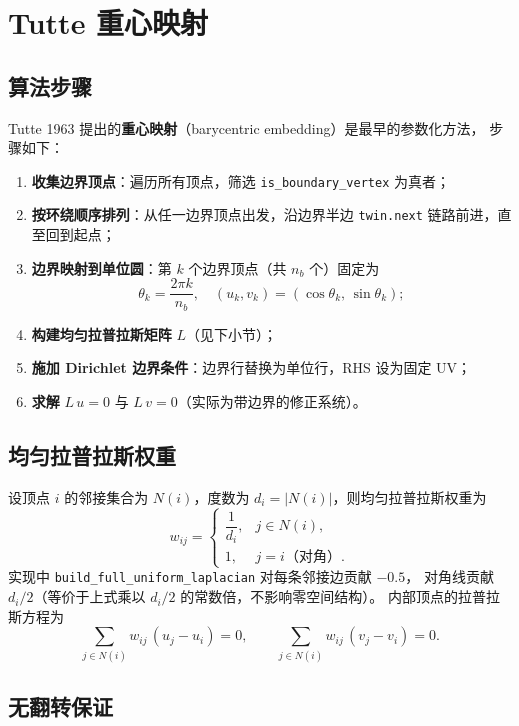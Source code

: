 \documentclass[11pt,a4paper]{article}
\begin{document}
\section{Tutte 重心映射}

\subsection{算法步骤}

Tutte 1963 提出的\textbf{重心映射}（barycentric embedding）是最早的参数化方法，
步骤如下：

\begin{enumerate}
  \item \textbf{收集边界顶点}：遍历所有顶点，筛选 \texttt{is\_boundary\_vertex} 为真者；
  \item \textbf{按环绕顺序排列}：从任一边界顶点出发，沿边界半边
        \texttt{twin.next} 链路前进，直至回到起点；
  \item \textbf{边界映射到单位圆}：第 $k$ 个边界顶点（共 $n_b$ 个）固定为
        \[
          \theta_k = \frac{2\pi k}{n_b}, \quad
          (u_k, v_k) = (\cos\theta_k,\, \sin\theta_k);
        \]
  \item \textbf{构建均匀拉普拉斯矩阵} $L$（见下小节）；
  \item \textbf{施加 Dirichlet 边界条件}：边界行替换为单位行，RHS 设为固定 UV；
  \item \textbf{求解} $L\,u = 0$ 与 $L\,v = 0$（实际为带边界的修正系统）。
\end{enumerate}

\subsection{均匀拉普拉斯权重}

设顶点 $i$ 的邻接集合为 $N(i)$，度数为 $d_i = |N(i)|$，则均匀拉普拉斯权重为
\[
  w_{ij} =
  \begin{cases}
    \dfrac{1}{d_i}, & j \in N(i), \\[6pt]
    1,              & j = i \text{（对角）}.
  \end{cases}
\]
实现中 \texttt{build\_full\_uniform\_laplacian} 对每条邻接边贡献 $-0.5$，
对角线贡献 $d_i / 2$（等价于上式乘以 $d_i / 2$ 的常数倍，不影响零空间结构）。
内部顶点的拉普拉斯方程为
\[
  \sum_{j \in N(i)} w_{ij}\, (u_j - u_i) = 0,
  \qquad
  \sum_{j \in N(i)} w_{ij}\, (v_j - v_i) = 0.
\]

\subsection{无翻转保证}
\end{document}
